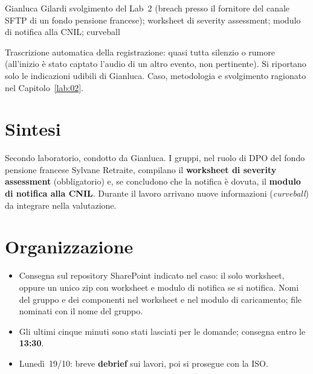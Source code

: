   {Gianluca Gilardi}
  {svolgimento del Lab~2 (breach presso il fornitore del canale SFTP di un fondo pensione francese);
   worksheet di severity assessment; modulo di notifica alla CNIL; curveball}
\label{lez:2026-10-16}

\begin{nota}[Fonte]
Trascrizione automatica della registrazione: quasi tutta silenzio o rumore (all'inizio è stato
captato l'audio di un altro evento, non pertinente). Si riportano solo le indicazioni udibili di
Gianluca. Caso, metodologia e svolgimento ragionato nel Capitolo~\ref{lab:02}.
\end{nota}

\section{Sintesi}
Secondo laboratorio, condotto da Gianluca. I gruppi, nel ruolo di DPO del fondo pensione francese
Sylvane Retraite, compilano il \textbf{worksheet di severity assessment} (obbligatorio) e, se
concludono che la notifica è dovuta, il \textbf{modulo di notifica alla CNIL}. Durante il lavoro
arrivano nuove informazioni (\emph{curveball}) da integrare nella valutazione.

\section{Organizzazione}
\begin{itemize}
  \item Consegna sul repository SharePoint indicato nel caso: il solo worksheet, oppure un unico zip
    con worksheet e modulo di notifica se si notifica. Nomi del gruppo e dei componenti nel worksheet
    e nel modulo di caricamento; file nominati con il nome del gruppo.
  \item Gli ultimi cinque minuti sono stati lasciati per le domande; consegna entro le
    \textbf{13:30}.
  \item Lunedì~19/10: breve \textbf{debrief} sui lavori, poi si prosegue con la ISO.
\end{itemize}

